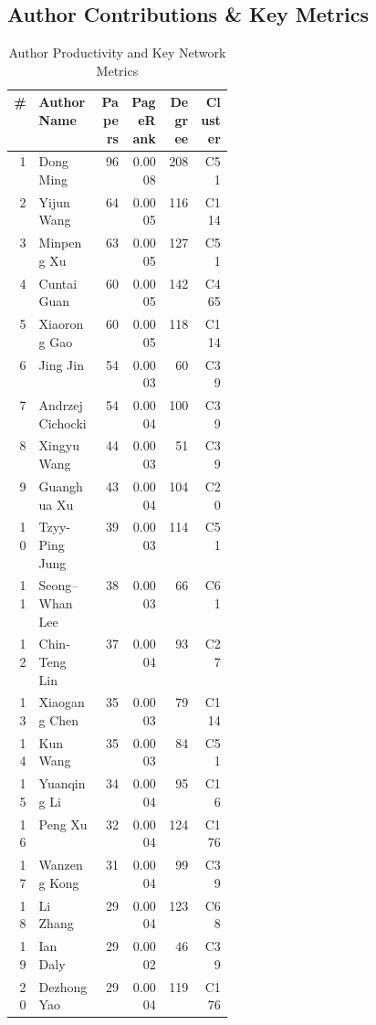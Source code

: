 \subsection{Author Contributions \& Key Metrics}
\begin{table}[htbp]
\centering
\small
\setlength{\tabcolsep}{4pt}
\caption{Author Productivity and Key Network Metrics}
\label{tab:authors_overview}
\begin{tabular}{r p{0.28\linewidth} r r r r}
\toprule
\textbf{\#} & \textbf{Author Name} & \textbf{Papers} & \textbf{PageRank} & \textbf{Degree} & \textbf{Cluster} \\
\midrule
1 & Dong Ming & 96 & 0.0008 & 208 & C51 \\
2 & Yijun Wang & 64 & 0.0005 & 116 & C114 \\
3 & Minpeng Xu & 63 & 0.0005 & 127 & C51 \\
4 & Cuntai Guan & 60 & 0.0005 & 142 & C465 \\
5 & Xiaorong Gao & 60 & 0.0005 & 118 & C114 \\
6 & Jing Jin & 54 & 0.0003 & 60 & C39 \\
7 & Andrzej Cichocki & 54 & 0.0004 & 100 & C39 \\
8 & Xingyu Wang & 44 & 0.0003 & 51 & C39 \\
9 & Guanghua Xu & 43 & 0.0004 & 104 & C20 \\
10 & Tzyy-Ping Jung & 39 & 0.0003 & 114 & C51 \\
11 & Seong–Whan Lee & 38 & 0.0003 & 66 & C61 \\
12 & Chin-Teng Lin & 37 & 0.0004 & 93 & C27 \\
13 & Xiaogang Chen & 35 & 0.0003 & 79 & C114 \\
14 & Kun Wang & 35 & 0.0003 & 84 & C51 \\
15 & Yuanqing Li & 34 & 0.0004 & 95 & C16 \\
16 & Peng Xu & 32 & 0.0004 & 124 & C176 \\
17 & Wanzeng Kong & 31 & 0.0004 & 99 & C39 \\
18 & Li Zhang & 29 & 0.0004 & 123 & C68 \\
19 & Ian Daly & 29 & 0.0002 & 46 & C39 \\
20 & Dezhong Yao & 29 & 0.0004 & 119 & C176 \\
\bottomrule
\end{tabular}
\end{table}